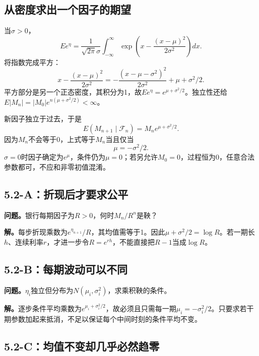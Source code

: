 \documentclass[11pt,a4paper,UTF8,fontset=fandol]{ctexart}
\begin{document}
\subsection{从密度求出一个因子的期望}\label{ux4eceux5bc6ux5ea6ux6c42ux51faux4e00ux4e2aux56e0ux5b50ux7684ux671fux671b}

当\(\sigma>0\)，
\[Ee^\eta=\frac1{\sqrt{2\pi}\sigma}\int_{-\infty}^{\infty}
\exp\left(x-\frac{(x-\mu)^2}{2\sigma^2}\right)dx.\] 将指数完成平方：
\[x-\frac{(x-\mu)^2}{2\sigma^2}
=-\frac{(x-\mu-\sigma^2)^2}{2\sigma^2}+\mu+\sigma^2/2.\]
平方部分是另一个正态密度，其积分为1，故\(Ee^\eta=e^{\mu+\sigma^2/2}\)。独立性还给\(E|M_n|=|M_0|e^{n(\mu+\sigma^2/2)}<\infty\)。

新因子独立于过去，于是
\[E(M_{n+1}\mid\mathcal F_n)=M_ne^{\mu+\sigma^2/2}.\]
因为\(M_n\)不会等于0，上式等于\(M_n\)当且仅当
\[\boxed{\mu=-\sigma^2/2.}\]
\(\sigma=0\)时因子确定为\(e^\mu\)，条件仍为\(\mu=0\)；若另允许\(M_0=0\)，过程恒为0，任意合法参数都可，不应和非零初值混淆。

\subsection{5.2-A：折现后才要求公平}\label{aux6298ux73b0ux540eux624dux8981ux6c42ux516cux5e73}

\textbf{问题。}银行每期因子为\(R>0\)，何时\(M_n/R^n\)是鞅？

\textbf{解。}每步折现乘数为\(e^{\eta_{n+1}}/R\)，其均值需等于1。因此\(\boxed{\mu+\sigma^2/2=\log R}\)。若一期长\(h\)、连续利率\(r\)，才进一步令\(R=e^{rh}\)，不能直接把\(R-1\)当成\(\log R\)。

\subsection{5.2-B：每期波动可以不同}\label{bux6bcfux671fux6ce2ux52a8ux53efux4ee5ux4e0dux540c}

\textbf{问题。}\(\eta_i\)独立但分布为\(N(\mu_i,\sigma_i^2)\)，求乘积鞅的条件。

\textbf{解。}逐步条件平均乘数为\(e^{\mu_i+\sigma_i^2/2}\)，故必须且只需每一期\(\boxed{\mu_i=-\sigma_i^2/2}\)。只要求若干期参数加起来抵消，不足以保证每个中间时刻的条件平均不变。

\subsection{5.2-C：均值不变却几乎必然趋零}\label{cux5747ux503cux4e0dux53d8ux5374ux51e0ux4e4eux5fc5ux7136ux8d8bux96f6}
\end{document}
